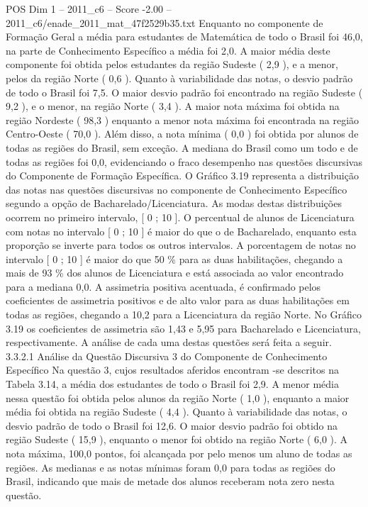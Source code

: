 \begin{textsample}{POS Dim 1 – 2011\_c6 – Score -2.00 – 2011\_c6/enade\_2011\_mat\_47f2529b35.txt}
Enquanto no componente de Formação Geral a média para estudantes de Matemática de todo o Brasil foi 46,0, na parte de Conhecimento Específico a média foi 2,0.
A maior média deste componente foi obtida pelos estudantes da região Sudeste ( 2,9 ), e a menor, pelos da região Norte ( 0,6 ).
Quanto à variabilidade das notas, o desvio padrão de todo o Brasil foi 7,5.
O maior desvio padrão foi encontrado na região Sudeste ( 9,2 ), e o menor, na região Norte ( 3,4 ).
A maior nota máxima foi obtida na região Nordeste ( 98,3 ) enquanto a menor nota máxima foi encontrada na região Centro-Oeste ( 70,0 ).
Além disso, a nota mínima ( 0,0 ) foi obtida por alunos de todas as regiões do Brasil, sem exceção.
A mediana do Brasil como um todo e de todas as regiões foi 0,0, evidenciando o fraco desempenho nas questões discursivas do Componente de Formação Específica.
O Gráfico 3.19 representa a distribuição das notas nas questões discursivas no componente de Conhecimento Específico segundo a opção de Bacharelado/Licenciatura.
As modas destas distribuições ocorrem no primeiro intervalo, [ 0 ; 10 ].
O percentual de alunos de Licenciatura com notas no intervalo [ 0 ; 10 ] é maior do que o de Bacharelado, enquanto esta proporção se inverte para todos os outros intervalos.
A porcentagem de notas no intervalo [ 0 ; 10 ] é maior do que 50 \% para as duas habilitações, chegando a mais de 93 \% dos alunos de Licenciatura e está associada ao valor encontrado para a mediana 0,0.
A assimetria positiva acentuada, é confirmado pelos coeficientes de assimetria positivos e de alto valor para as duas habilitações em todas as regiões, chegando a 10,2 para a Licenciatura da região Norte.
No Gráfico 3.19 os coeficientes de assimetria são 1,43 e 5,95 para Bacharelado e Licenciatura, respectivamente.
A análise de cada uma destas questões será feita a seguir. 3.3.2.1 Análise da Questão Discursiva 3 do Componente de Conhecimento Específico Na questão 3, cujos resultados aferidos encontram -se descritos na Tabela 3.14, a média dos estudantes de todo o Brasil foi 2,9.
A menor média nessa questão foi obtida pelos alunos da região Norte ( 1,0 ), enquanto a maior média foi obtida na região Sudeste ( 4,4 ).
Quanto à variabilidade das notas, o desvio padrão de todo o Brasil foi 12,6.
O maior desvio padrão foi obtido na região Sudeste ( 15,9 ), enquanto o menor foi obtido na região Norte ( 6,0 ).
A nota máxima, 100,0 pontos, foi alcançada por pelo menos um aluno de todas as regiões.
As medianas e as notas mínimas foram 0,0 para todas as regiões do Brasil, indicando que mais de metade dos alunos receberam nota zero nesta questão.

\end{textsample}
